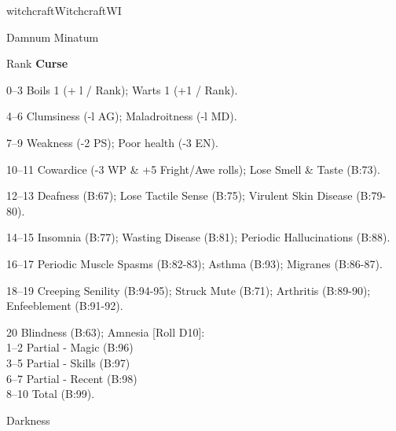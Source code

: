 \begin{college}[1.1]{witchcraft}{Witchcraft}{WI}
\begin{spell}[G-1]{Damnum Minatum}
\begin{effects}
\begin{Description}
\item[Rank] \textbf{Curse}
\item[0--3] Boils 1 (+ l / Rank); Warts 1 (+1 / Rank).
\item[4--6] Clumsiness (-l AG); Maladroitness (-l MD).
\item[7--9] Weakness (-2 PS); Poor health (-3 EN).
\item[10--11] Cowardice (-3 WP \& +5 Fright/Awe rolls); Lose Smell \& Taste (B:73).
\item[12--13] Deafness (B:67); Lose Tactile Sense (B:75); Virulent Skin Disease (B:79-80).
\item[14--15] Insomnia (B:77); Wasting Disease (B:81); Periodic Hallucinations (B:88).
\item[16--17] Periodic Muscle Spasms (B:82-83); Asthma (B:93); Migranes (B:86-87).
\item[18--19] Creeping Senility (B:94-95); Struck Mute (B:71); Arthritis (B:89-90); Enfeeblement (B:91-92).
\item[20] Blindness (B:63); Amnesia [Roll D10]: \\
\hspace*{2em} 1--2 Partial - Magic (B:96) \\
\hspace*{2em} 3--5 Partial - Skills (B:97) \\
\hspace*{2em} 6--7 Partial - Recent (B:98) \\
\hspace*{2em} 8--10 Total (B:99). \\
\end{Description}
\end{effects}
\end{spell}

\begin{spell}[G-2]{Darkness}


\end{spell}
\end{college}
